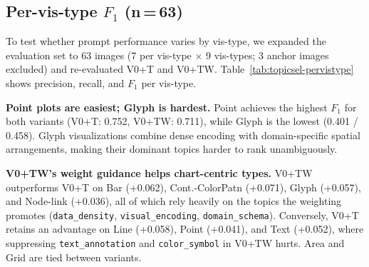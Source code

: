 \subsection{Per-vis-type \texorpdfstring{$F_1$}{F1} (n\,=\,63)}
\label{app:topicsel-pervistype}

To test whether prompt performance varies by vis-type, we expanded
the evaluation set to 63 images (7 per vis-type $\times$ 9 vis-types;
3 anchor images excluded) and re-evaluated V0+T and V0+TW.
Table~\ref{tab:topicsel-pervistype} shows precision, recall, and
$F_1$ per vis-type.

\textbf{Point plots are easiest; Glyph is hardest.}
Point achieves the highest $F_1$ for both variants (V0+T: 0.752,
V0+TW: 0.711), while Glyph is the lowest (0.401 / 0.458). Glyph
visualizations combine dense encoding with domain-specific spatial
arrangements, making their dominant topics harder to rank
unambiguously.

\textbf{V0+TW's weight guidance helps chart-centric types.}
V0+TW outperforms V0+T on Bar (+0.062), Cont.-ColorPatn (+0.071),
Glyph (+0.057), and Node-link (+0.036), all of which rely heavily on
the topics the weighting promotes (\texttt{data\_density},
\texttt{visual\_encoding}, \texttt{domain\_schema}).
Conversely, V0+T retains an advantage on Line (+0.058), Point
(+0.041), and Text (+0.052), where suppressing
\texttt{text\_annotation} and \texttt{color\_symbol} in V0+TW hurts.
Area and Grid are tied between variants.

